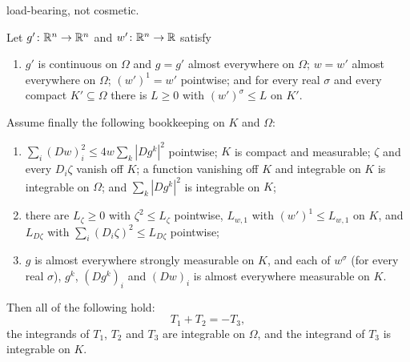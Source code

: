 \begin{helper}
\begin{enumerate}
{  load-bearing, not cosmetic.}
\end{enumerate}
Let $g'\colon\mathbb{R}^n\to\mathbb{R}^n$ and $w'\colon\mathbb{R}^n\to\mathbb{R}$ satisfy
\begin{enumerate}
\item[(H6)] $g'$ is continuous on $\Omega$ and $g=g'$ almost everywhere on
  $\Omega$; $w=w'$ almost everywhere on $\Omega$; $(w')^1=w'$ pointwise; and for
  every real $\sigma$ and every compact $K'\subseteq\Omega$ there is $L\ge0$
  with $(w')^\sigma\le L$ on $K'$.
\end{enumerate}
Assume finally the following bookkeeping on $K$ and $\Omega$:
\begin{enumerate}
\item[(H7)] $\sum_i(Dw)_i^2\le4w\sum_k|Dg^k|^2$ pointwise; $K$ is compact and
  measurable; $\zeta$ and every $D_i\zeta$ vanish off $K$; a function vanishing
  off $K$ and integrable on $K$ is integrable on $\Omega$; and
  $\sum_k|Dg^k|^2$ is integrable on $K$;
\item[(H8)] there are $L_\zeta\ge0$ with $\zeta^2\le L_\zeta$ pointwise,
  $L_{w,1}$ with $(w')^1\le L_{w,1}$ on $K$, and $L_{D\zeta}$ with
  $\sum_i(D_i\zeta)^2\le L_{D\zeta}$ pointwise;
\item[(H9)] $g$ is almost everywhere strongly measurable on $K$, and each of
  $w^\sigma$ (for every real $\sigma$), $g^k$, $(Dg^k)_i$ and $(Dw)_i$ is almost
  everywhere measurable on $K$.
\end{enumerate}
Then all of the following hold:
\[
T_1+T_2=-T_3 ,
\]
the integrands of $T_1$, $T_2$ and $T_3$ are integrable on $\Omega$, and the
integrand of $T_3$ is integrable on $K$.
\end{helper}
